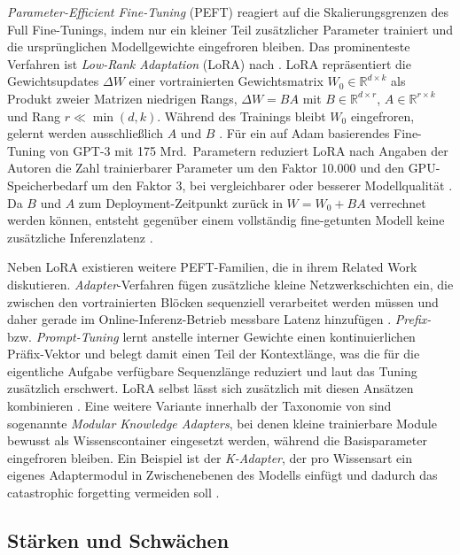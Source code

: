 \textit{Parameter-Efficient Fine-Tuning} (PEFT) reagiert auf die Skalierungsgrenzen des Full Fine-Tunings, indem nur ein kleiner Teil zusätzlicher Parameter trainiert und die ursprünglichen Modellgewichte eingefroren bleiben. Das prominenteste Verfahren ist \textit{Low-Rank Adaptation} (LoRA) nach \textcite[4]{Hu.2022}. LoRA repräsentiert die Gewichtsupdates $\Delta W$ einer vortrainierten Gewichtsmatrix $W_0 \in \mathbb{R}^{d \times k}$ als Produkt zweier Matrizen niedrigen Rangs, $\Delta W = BA$ mit $B \in \mathbb{R}^{d \times r}$, $A \in \mathbb{R}^{r \times k}$ und Rang $r \ll \min(d,k)$. Während des Trainings bleibt $W_0$ eingefroren, gelernt werden ausschließlich $A$ und $B$ \autocite[4]{Hu.2022}. Für ein auf Adam basierendes Fine-Tuning von GPT-3 mit 175 Mrd.\ Parametern reduziert LoRA nach Angaben der Autoren die Zahl trainierbarer Parameter um den Faktor 10.000 und den GPU-Speicherbedarf um den Faktor 3, bei vergleichbarer oder besserer Modellqualität \autocite[1]{Hu.2022}. Da $B$ und $A$ zum Deployment-Zeitpunkt zurück in $W = W_0 + BA$ verrechnet werden können, entsteht gegenüber einem vollständig fine-getunten Modell keine zusätzliche Inferenzlatenz \autocite[4]{Hu.2022}.

Neben LoRA existieren weitere PEFT-Familien, die \textcite[3]{Hu.2022} in ihrem Related Work diskutieren. \textit{Adapter}-Verfahren fügen zusätzliche kleine Netzwerkschichten ein, die zwischen den vortrainierten Blöcken sequenziell verarbeitet werden müssen und daher gerade im Online-Inferenz-Betrieb messbare Latenz hinzufügen \autocite[3]{Hu.2022}. \textit{Prefix-} bzw. \textit{Prompt-Tuning} lernt anstelle interner Gewichte einen kontinuierlichen Präfix-Vektor und belegt damit einen Teil der Kontextlänge, was die für die eigentliche Aufgabe verfügbare Sequenzlänge reduziert und laut \textcite[3]{Hu.2022} das Tuning zusätzlich erschwert. 
LoRA selbst lässt sich zusätzlich mit diesen Ansätzen kombinieren \autocite[2]{Hu.2022}. Eine weitere Variante innerhalb der Taxonomie von \textcite[4]{Song.2025} sind sogenannte \textit{Modular Knowledge Adapters}, bei denen kleine trainierbare Module bewusst als Wissenscontainer eingesetzt werden, während die Basisparameter eingefroren bleiben. Ein Beispiel ist der \textit{K-Adapter}, der pro Wissensart ein eigenes Adaptermodul in Zwischenebenen des Modells einfügt und dadurch das catastrophic forgetting vermeiden soll \autocite[7]{Song.2025}.

\subsection{Stärken und Schwächen}
\label{sec:ft-swot}

